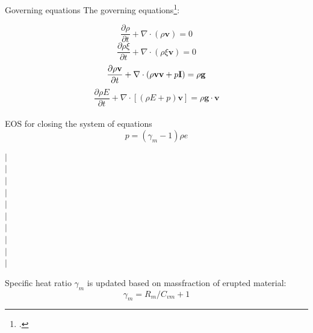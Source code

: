 \documentclass{beamer}
\begin{document}
\begin{frame}{Governing equations}
The governing equations\footcite{suzuki2005numerical}:\\
\begin{minipage}{.505\textwidth}
\begin{equation}
\dfrac{\partial \rho}{\partial t} + \nabla \cdot \left(\rho \textbf{v}\right) = 0 \label{eq:gov-cs-rho}
\end{equation}
\begin{equation}
\dfrac{\partial \rho \xi}{\partial t} + \nabla \cdot \left(\rho \xi \textbf{v}\right) = 0 \label{eq:gov-cs-ks}
\end{equation}
\begin{equation}
\dfrac{\partial \rho \textbf{v}}{\partial t} + \nabla \cdot \left(\rho \textbf{v} \textbf{v} + p\textbf{I}\right) = \rho \textbf{g} \label{eq:gov-cs-v} \\
\end{equation}
\begin{equation}
\dfrac{\partial \rho E}{\partial t} + \nabla \cdot \left[\left(\rho E + p \right)\textbf{v}\right] = \rho \textbf{g} \cdot\textbf{v} \label{eq:gov-cs-e}
\end{equation}\\
EOS for closing the system of equations
\begin{equation}
p = \left(\gamma_m - 1\right)\rho e \label{eq:EOS}
\end{equation}
%
\end{minipage} %
%
\begin{minipage}{.01\textwidth}
$\vert$\\
$\vert$\\
$\vert$\\
$\vert$\\
$\vert$\\
$\vert$\\
$\vert$\\
$\vert$\\
$\vert$\\
$\vert$\\
\end{minipage}
\begin{minipage}{.46\textwidth}
Specific heat ratio $\gamma_m$ is updated based on massfraction of erupted material:
\begin{equation}
\gamma_m = R_m/C_{vm} + 1 \label{eq:gov-gm}
\end{equation}
\begin{equation}

\end{equation}
\end{minipage}
\end{frame}
\end{document}
